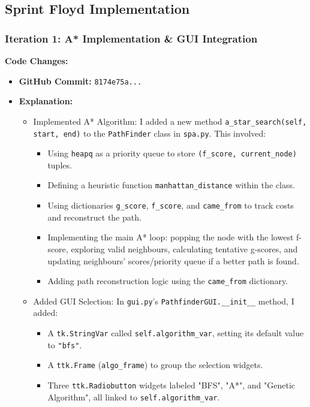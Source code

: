 \clearpage
\subsection{Sprint Floyd Implementation}

\subsubsection{Iteration 1: A* Implementation \& GUI Integration}

\textbf{Code Changes:}
\begin{itemize}
	\item \textbf{GitHub Commit:} \verb|8174e75a...|
	\item \textbf{Explanation:}
	\begin{itemize}
		\item Implemented A* Algorithm: I added a new method \verb|a_star_search(self, start, end)| to the \verb|PathFinder| class in \verb|spa.py|. This involved:
		\begin{itemize}
			\item Using \verb|heapq| as a priority queue to store \verb|(f_score, current_node)| tuples.
			\item Defining a heuristic function \verb|manhattan_distance| within the class.
			\item Using dictionaries \verb|g_score|, \verb|f_score|, and \verb|came_from| to track costs and reconstruct the path.
			\item Implementing the main A* loop: popping the node with the lowest f-score, exploring valid neighbours, calculating tentative g-scores, and updating neighbours' scores/priority queue if a better path is found.
			\item Adding path reconstruction logic using the \verb|came_from| dictionary.
		\end{itemize}
		\item Added GUI Selection: In \verb|gui.py|'s \verb|PathfinderGUI.__init__| method, I added:
		\begin{itemize}
			\item A \verb|tk.StringVar| called \verb|self.algorithm_var|, setting its default value to \verb|"bfs"|.
			\item A \verb|ttk.Frame| (\verb|algo_frame|) to group the selection widgets.
			\item Three \verb|ttk.Radiobutton| widgets labeled "BFS", "A*", and "Genetic Algorithm", all linked to \verb|self.algorithm_var|.
		\end{itemize}

\end{itemize}
\end{itemize}
